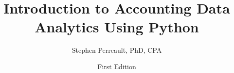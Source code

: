 \documentclass{book}
\begin{document}
	\title {Introduction to Accounting Data Analytics Using Python}
	\author{Stephen Perreault, PhD, CPA}
	\date{First Edition}
	\maketitle
		
\end{document}
